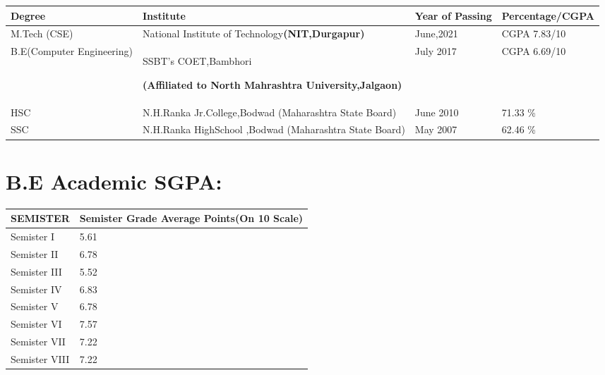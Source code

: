 \documentclass[a4paper,10pt]{article}
\begin{document}
\begin{center}
\begin{tabular}{ | m{2.0cm} | m{7.0cm}| m{3.5cm} | m{3cm} | } 
\hline
\textbf{Degree} & \textbf{Institute}    & \textbf{Year of Passing}  & \textbf{Percentage/CGPA }  \\ 
\hline
M.Tech (CSE)  & National Institute of Technology\newline\textbf{\small (NIT,Durgapur)}   & June,2021 & CGPA 7.83/10\\


\hline
B.E\newline(Computer Engineering) & SSBT’s COET,Bambhori

\textbf{\small (Affiliated to North Mahrashtra University,Jalgaon)}& July 2017  & CGPA 6.69/10 \\

\hline
HSC  & N.H.Ranka Jr.College,Bodwad\newline
{\small (Maharashtra State Board)}& June 2010 & 71.33 \% \\

\hline
SSC & N.H.Ranka HighSchool ,Bodwad\newline
{\small (Maharashtra State Board)}
  & May 2007 & 62.46 \%\\ 
\hline
\end{tabular}
\end{center}








\iffalse
\section{B.E Academic SGPA:}

\begin{tabu} to 0.8\textwidth { | X[l] | X[l] |  }
 \hline
 
 \Large
 SEMISTER  & \Large
  Semister Grade Average Points(On 10 Scale)   \\
\hline
\large Semister I & 5.61   \\
 \hline
 
\large Semister II & 6.78  \\
 \hline
 
 \large Semister III  &  5.52 \\
 \hline
 
\large  Semister IV & 6.83  \\
 \hline
 
\large Semister  V &   6.78 \\
 \hline
 
\large Semister VI &   7.57\\
 \hline
 
\large Semister VII  & 7.22  \\
 \hline
 
 \large Semister VIII & 7.22  \\
 \hline

\end{tabu}
\end{document}
